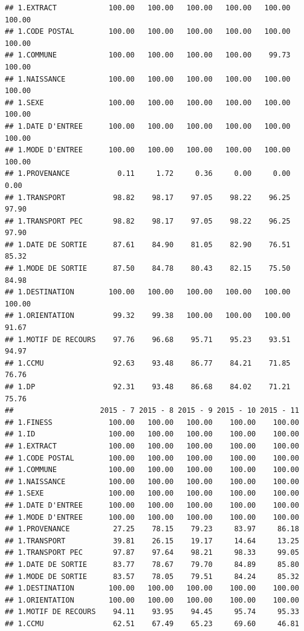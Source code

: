 \documentclass[]{article}
\begin{document}
\begin{verbatim}
## 1.EXTRACT            100.00   100.00   100.00   100.00   100.00   100.00
## 1.CODE POSTAL        100.00   100.00   100.00   100.00   100.00   100.00
## 1.COMMUNE            100.00   100.00   100.00   100.00    99.73   100.00
## 1.NAISSANCE          100.00   100.00   100.00   100.00   100.00   100.00
## 1.SEXE               100.00   100.00   100.00   100.00   100.00   100.00
## 1.DATE D'ENTREE      100.00   100.00   100.00   100.00   100.00   100.00
## 1.MODE D'ENTREE      100.00   100.00   100.00   100.00   100.00   100.00
## 1.PROVENANCE           0.11     1.72     0.36     0.00     0.00     0.00
## 1.TRANSPORT           98.82    98.17    97.05    98.22    96.25    97.90
## 1.TRANSPORT PEC       98.82    98.17    97.05    98.22    96.25    97.90
## 1.DATE DE SORTIE      87.61    84.90    81.05    82.90    76.51    85.32
## 1.MODE DE SORTIE      87.50    84.78    80.43    82.15    75.50    84.98
## 1.DESTINATION        100.00   100.00   100.00   100.00   100.00   100.00
## 1.ORIENTATION         99.32    99.38   100.00   100.00   100.00    91.67
## 1.MOTIF DE RECOURS    97.76    96.68    95.71    95.23    93.51    94.97
## 1.CCMU                92.63    93.48    86.77    84.21    71.85    76.76
## 1.DP                  92.31    93.48    86.68    84.02    71.21    75.76
##                    2015 - 7 2015 - 8 2015 - 9 2015 - 10 2015 - 11
## 1.FINESS             100.00   100.00   100.00    100.00    100.00
## 1.ID                 100.00   100.00   100.00    100.00    100.00
## 1.EXTRACT            100.00   100.00   100.00    100.00    100.00
## 1.CODE POSTAL        100.00   100.00   100.00    100.00    100.00
## 1.COMMUNE            100.00   100.00   100.00    100.00    100.00
## 1.NAISSANCE          100.00   100.00   100.00    100.00    100.00
## 1.SEXE               100.00   100.00   100.00    100.00    100.00
## 1.DATE D'ENTREE      100.00   100.00   100.00    100.00    100.00
## 1.MODE D'ENTREE      100.00   100.00   100.00    100.00    100.00
## 1.PROVENANCE          27.25    78.15    79.23     83.97     86.18
## 1.TRANSPORT           39.81    26.15    19.17     14.64     13.25
## 1.TRANSPORT PEC       97.87    97.64    98.21     98.33     99.05
## 1.DATE DE SORTIE      83.77    78.67    79.70     84.89     85.80
## 1.MODE DE SORTIE      83.57    78.05    79.51     84.24     85.32
## 1.DESTINATION        100.00   100.00   100.00    100.00    100.00
## 1.ORIENTATION        100.00   100.00   100.00    100.00    100.00
## 1.MOTIF DE RECOURS    94.11    93.95    94.45     95.74     95.33
## 1.CCMU                62.51    67.49    65.23     69.60     46.81

\end{verbatim}
\end{document}
